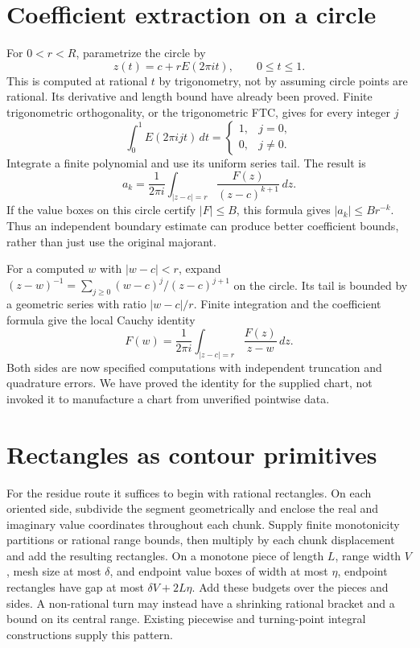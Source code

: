 \section{Coefficient extraction on a circle}
For $0<r<R$, parametrize the circle by
\[
 z(t)=c+rE(2\pi it),\qquad 0\le t\le1.
\]
This is computed at rational $t$ by trigonometry, not by assuming circle
points are rational.  Its derivative and length bound have already been
proved.  Finite trigonometric orthogonality, or the trigonometric FTC,
gives for every integer $j$
\[
 \int_0^1 E(2\pi ijt)\,dt=\begin{cases}1,&j=0,\\0,&j\ne0.\end{cases}
\]
Integrate a finite polynomial and use its uniform series tail.  The result is
\[
 \boxed{a_k=\frac1{2\pi i}\int_{|z-c|=r}
                  \frac{F(z)}{(z-c)^{k+1}}\,dz.}
\]
If the value boxes on this circle certify $|F|\le B$, this formula gives
$|a_k|\le B r^{-k}$.  Thus an independent boundary estimate can produce
better coefficient bounds, rather than just use the original majorant.

For a computed $w$ with $|w-c|<r$, expand
$(z-w)^{-1}=\sum_{j\ge0}(w-c)^j/(z-c)^{j+1}$ on the circle.  Its tail
is bounded by a geometric series with ratio $|w-c|/r$.  Finite integration
and the coefficient formula give the local Cauchy identity
\[
 \boxed{F(w)=\frac1{2\pi i}\int_{|z-c|=r}
                         \frac{F(z)}{z-w}\,dz.}
\]
Both sides are now specified computations with independent truncation and
quadrature errors.  We have proved the identity for the supplied chart,
not invoked it to manufacture a chart from unverified pointwise data.

\section{Rectangles as contour primitives}
For the residue route it suffices to begin with rational rectangles.
On each oriented side, subdivide the segment geometrically and enclose
the real and imaginary value coordinates throughout each chunk. Supply
finite monotonicity partitions or rational range bounds, then multiply
by each chunk displacement and add the resulting rectangles.
On a monotone piece of length $L$, range width $V$, mesh size at most
$\delta$, and endpoint value boxes of width at most $\eta$, endpoint
rectangles have gap at most $\delta V+2L\eta$. Add these budgets over the
pieces and sides. A non-rational turn may instead have a shrinking rational
bracket and a bound on its central range. Existing piecewise and turning-point
integral constructions supply this pattern.

